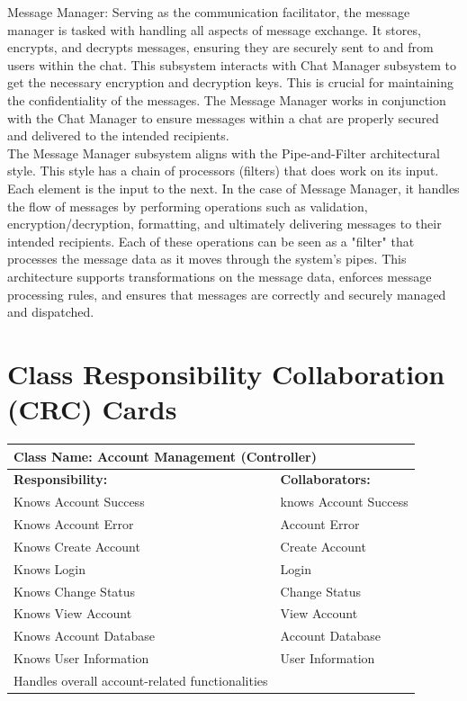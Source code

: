 \documentclass[]{article}
\begin{document}
Message Manager: Serving as the communication facilitator, the message manager is tasked with handling all aspects of message exchange. It stores, encrypts, and decrypts messages, ensuring they are securely sent to and from users within the chat. This subsystem interacts with Chat Manager subsystem to get the necessary encryption and decryption keys. This is crucial for maintaining the confidentiality of the messages. The Message Manager works in conjunction with the Chat Manager to ensure messages within a chat are properly secured and delivered to the intended recipients. \\

The Message Manager subsystem aligns with the Pipe-and-Filter architectural style. This style has a chain of processors (filters) that does work on its input. Each element is the input to the next. In the case of Message Manager, it handles the flow of messages by performing operations such as validation, encryption/decryption, formatting, and ultimately delivering messages to their intended recipients. Each of these operations can be seen as a "filter" that processes the message data as it moves through the system's pipes. This architecture supports transformations on the message data, enforces message processing rules, and ensures that messages are correctly and securely managed and dispatched.\\


	
\section{Class Responsibility Collaboration (CRC) Cards}
\label{sec:class_responsibility_collaboration_crc_cards}

	\begin{table}[ht]
		\centering
		\begin{tabular}{|p{7cm}|p{7cm}|}
		\hline 
		 \multicolumn{2}{|l|}{\textbf{Class Name:} Account Management (Controller)} \\
		\hline
		\textbf{Responsibility:} & \textbf{Collaborators:} \\
		\hline
		Knows Account Success & knows Account Success\\
		Knows Account Error & Account Error \\
		Knows Create Account & Create Account\\
		Knows Login & Login\\
		Knows Change Status & Change Status\\
		Knows View Account & View Account\\
		Knows Account Database & Account Database\\
		Knows User Information &User Information\\
		Handles overall account-related functionalities
		\vspace{0.1in} & \\
		\hline
		\end{tabular}
	\end{table}
\end{document}
